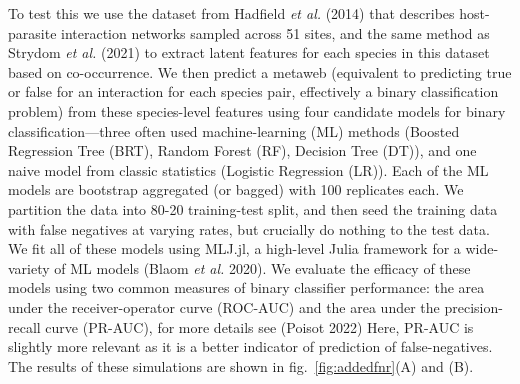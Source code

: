 \documentclass[10pt,oneside]{article}
\begin{document}
To test this we use the dataset from Hadfield \emph{et al.} (2014) that
describes host-parasite interaction networks sampled across 51 sites,
and the same method as Strydom \emph{et al.} (2021) to extract latent
features for each species in this dataset based on co-occurrence. We
then predict a metaweb (equivalent to predicting true or false for an
interaction for each species pair, effectively a binary classification
problem) from these species-level features using four candidate models
for binary classification---three often used machine-learning (ML)
methods (Boosted Regression Tree (BRT), Random Forest (RF), Decision
Tree (DT)), and one naive model from classic statistics (Logistic
Regression (LR)). Each of the ML models are bootstrap aggregated (or
bagged) with 100 replicates each. We partition the data into 80-20
training-test split, and then seed the training data with false
negatives at varying rates, but crucially do nothing to the test data.
We fit all of these models using MLJ.jl, a high-level Julia framework
for a wide-variety of ML models (Blaom \emph{et al.} 2020). We evaluate
the efficacy of these models using two common measures of binary
classifier performance: the area under the receiver-operator curve
(ROC-AUC) and the area under the precision-recall curve (PR-AUC), for
more details see (Poisot 2022) Here, PR-AUC is slightly more relevant as
it is a better indicator of prediction of false-negatives. The results
of these simulations are shown in fig.~\ref{fig:addedfnr}(A) and (B).
\end{document}
